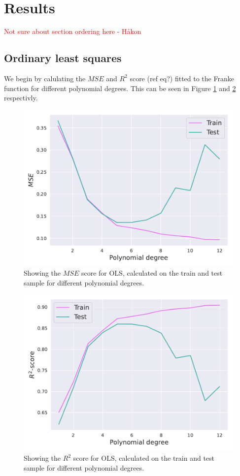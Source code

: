 \documentclass[twocolumn,english,notitlepage]{article}
\newcommand{\comment}[1]{\textcolor{red}{#1}\\}
\begin{document}
\section{Results}
    \comment{Not sure about section ordering here - Håkon}
    \subsection{Ordinary least squares}
    We begin by calulating the $MSE$ and $R^2$ score (ref eq?) fitted to the Franke function for different polynomial degrees. This can be seen in Figure \ref{fig:res:OLS_mse_noresample} and \ref{fig:res:OLS_R2_noresample} respectivly. 
    \begin{figure}[H]
        \centering
        \includegraphics[width=\linewidth]{OLS_mse_noresample.pdf}
        \caption{Showing the $MSE$ score for OLS, calculated on the train and test sample for different polynomial degrees.}
        \label{fig:res:OLS_mse_noresample}
    \end{figure}

    \begin{figure}[H]
        \centering
        \includegraphics[width=\linewidth]{OLS_r2_noresample.pdf}
        \caption{Showing the $R^2$ score for OLS, calculated on the train and test sample for different polynomial degrees.}
        \label{fig:res:OLS_R2_noresample}
    \end{figure}
\end{document}
